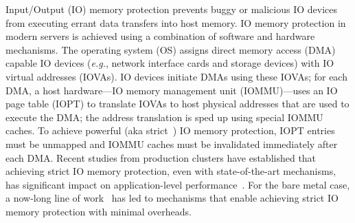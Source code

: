 Input/Output (IO) memory protection prevents buggy or malicious IO devices from executing errant data transfers 
    into host memory. 
IO memory protection in modern servers is achieved using a combination of software and hardware mechanisms. 
The operating system (OS) assigns direct memory access (DMA) capable IO devices (\textit{e.g.},
    network interface cards and storage devices) with IO virtual addresses (IOVAs). 
IO devices initiate DMAs using these IOVAs; for each DMA, a host hardware---IO memory management unit (IOMMU)---uses 
    an IO page table (IOPT) to translate IOVAs to host physical addresses 
    that are used to execute the DMA; 
    the address translation is sped up using special IOMMU caches. 
To achieve powerful (aka strict~\cite{Amit2011vIOMMU,Rubin2024FastSafe}) IO memory protection, 
    IOPT entries must be unmapped and IOMMU caches must be invalidated immediately after each DMA. 
Recent studies from production clusters have established that achieving strict IO memory protection, 
    even with state-of-the-art mechanisms, 
    has significant impact on application-level performance~\cite{agarwal2022understanding}. 
For the bare metal case, a now-long line of work~\cite{ben2007price, Malka2015rIOMMU, malka2015efficient, peleg2015utilizing, Markuze2016true, markuze2018damn, RajapakshaIOMMU, Rubin2024FastSafe} 
    has led to mechanisms that enable achieving strict IO memory protection with minimal overheads.

